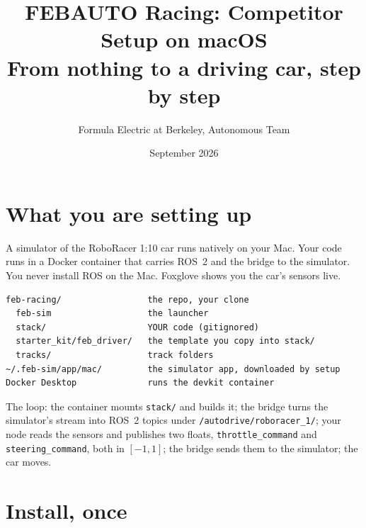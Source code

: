 \documentclass[11pt,a4paper]{article}
\title{\color{febblue}\LARGE FEBAUTO Racing: Competitor Setup on macOS\\[4pt]\large From nothing to a driving car, step by step}
\author{Formula Electric at Berkeley, Autonomous Team}
\date{September 2026}
\begin{document}
\maketitle

\section*{What you are setting up}

A simulator of the RoboRacer 1:10 car runs natively on your Mac. Your code runs in a Docker
container that carries ROS~2 and the bridge to the simulator. You never install ROS on the
Mac. Foxglove shows you the car's sensors live.

\begin{lstlisting}
feb-racing/                 the repo, your clone
  feb-sim                   the launcher
  stack/                    YOUR code (gitignored)
  starter_kit/feb_driver/   the template you copy into stack/
  tracks/                   track folders
~/.feb-sim/app/mac/         the simulator app, downloaded by setup
Docker Desktop              runs the devkit container
\end{lstlisting}

The loop: the container mounts \texttt{stack/} and builds it; the bridge turns the simulator's
stream into ROS~2 topics under \texttt{/autodrive/roboracer\_1/}; your node reads the sensors
and publishes two floats, \texttt{throttle\_command} and \texttt{steering\_command}, both in
$[-1, 1]$; the bridge sends them to the simulator; the car moves.

\section{Install, once}
\end{document}
